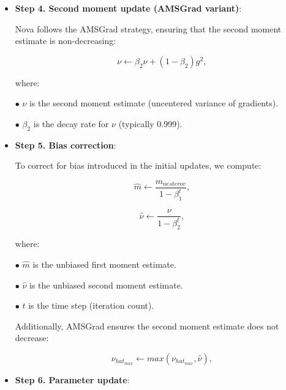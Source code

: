 \documentclass{article}
\begin{document}
\begin{itemize}
$\bullet$ m is the first moment estimate (moving average of the gradient).

​$\bullet$ $\beta_1$  is the momentum decay rate (typically 0.9).

$\bullet$ g is the current gradient.

Nesterov acceleration helps in reducing oscillations in gradient updates.


\item {\bf Step 4. Second moment update (AMSGrad variant)}:

Nova follows the AMSGrad strategy, ensuring that the second moment estimate is non-decreasing:

\begin{equation}
\nu \leftarrow \beta_2\nu+(1-\beta_2)g^2, 
\end{equation}

where:


$\bullet$ $\nu$ is the second moment estimate (uncentered variance of gradients).

$\bullet$ $\beta_2$ is the decay rate for $\nu$ (typically 0.999).


\item {\bf Step 5. Bias correction}:


To correct for bias introduced in the initial updates, we compute:


\begin{equation}
\hat{m} \leftarrow \dfrac{m_{nesterov}}{1-\beta_1^t},
\end{equation}


\begin{equation}
\hat{\nu} \leftarrow \dfrac{\nu}{1-\beta_2^t},
\end{equation}

where:


$\bullet$   $\hat{m}$ is the unbiased first moment estimate.

$\bullet$ $\hat{\nu}$ is the unbiased second moment estimate.

$\bullet$ $t$ is the time step (iteration count).


Additionally, AMSGrad ensures the second moment estimate does not decrease:


\begin{equation}
\nu_{hat_{max}} \leftarrow max(\nu_{hat_{max}}, \hat{\nu}),
\end{equation}




\item {\bf Step 6. Parameter update}:


\end{itemize}
\end{document}
